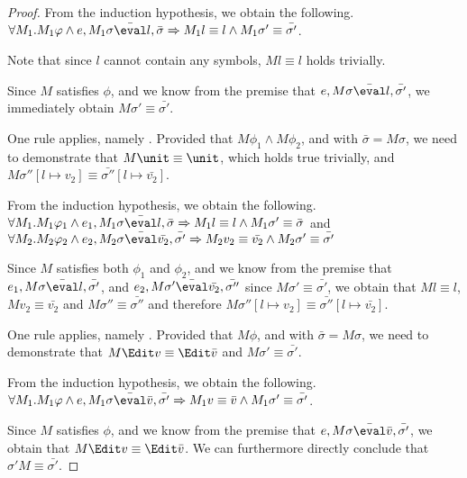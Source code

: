 \begin{proof}
{  From the induction hypothesis, we obtain the following.
  $\forall M_1 .  M_1\phi \wedge e, M_1\sigma \bar{\eval}l,\bar{\sigma}\implies  M_1l\equiv l \wedge  M_1\sigma'\equiv\bar{\sigma'}$.

  Note that since $l$ cannot contain any symbols, $M l \equiv l$ holds trivially.

  Since $M$ satisfies $\phi$,
  and we know from the premise that $e,M\sigma \bar{\eval}l,\bar{\sigma'}$,
  we immediately obtain $M\sigma'\equiv\bar{\sigma'}$.
}

  {
  One rule applies, namely .
  Provided that $M\phi_1\wedge M\phi_2$, and  with $\bar{\sigma}=M\sigma$,
  we need to demonstrate that $M\unit \equiv \unit$, which holds true trivially,
  and $M\sigma''[l\mapsto v_2]\equiv\bar{\sigma''}[l\mapsto\bar{v_2}]$.

  From the induction hypothesis, we obtain the following. $\forall M_1 .  M_1\phi_1 \wedge e_1, M_1\sigma \bar{\eval}l,\bar{\sigma}\implies  M_1 l\equiv l \wedge  M_1\sigma'\equiv\bar{\sigma}$ and
  $\forall M_2 . M_2\phi_2 \wedge e_2,M_2\sigma \bar{\eval}\bar{v_2},\bar{\sigma'}\implies M_2v_2\equiv \bar{v_2} \wedge M_2\sigma'\equiv\bar{\sigma'}$

  Since $M$ satisfies both $\phi_1$ and $\phi_2$,
  and we know from the premise that $e_1,M\sigma \bar{\eval}l,\bar{\sigma'}$,
  and $e_2,M\sigma'\bar{\eval}\bar{v_2},\bar{\sigma''}$ since $M\sigma'\equiv \bar{\sigma'}$,
  we obtain that $M l\equiv l$, $M v_2 \equiv \bar{v_2}$ and $M\sigma''\equiv\bar{\sigma''}$ and therefore $M\sigma''[l\mapsto v_2]\equiv\bar{\sigma''}[l\mapsto\bar{v_2}]$.
  }

  {One rule applies, namely .
  Provided that $M\phi$, and  with $\bar{\sigma}=M\sigma$,
  we need to demonstrate that $M \Edit v \equiv \Edit \bar{v}$ and $M\sigma'\equiv\bar{\sigma'}$.

  From the induction hypothesis, we obtain the following. $\forall M_1 .  M_1\phi \land e, M_1\sigma \bar{\eval}\bar{v},\bar{\sigma'}\implies  M_1v\equiv \bar{v} \land  M_1\sigma'\equiv\bar{\sigma'}$.

  Since $M$ satisfies $\phi$,
  and we know from the premise that $e,M\sigma \bar{\eval}\bar{v},\bar{\sigma'}$,
  we obtain that $M \Edit v\equiv \Edit \bar{v}$.
  We can furthermore directly conclude that $\sigma' M\equiv\bar{\sigma'}$.

  }


\end{proof}
